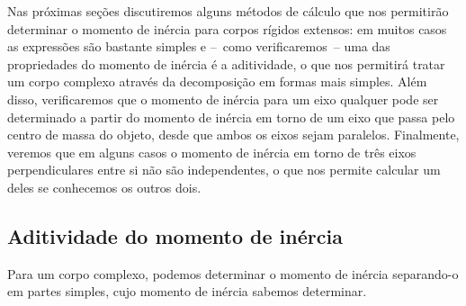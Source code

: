 Nas próximas seções discutiremos alguns métodos de cálculo que nos permitirão determinar o momento de inércia para corpos rígidos extensos: em muitos casos as expressões são bastante simples e --~como verificaremos~-- uma das propriedades do momento de inércia é a aditividade, o que nos permitirá tratar um corpo complexo através da decomposição em formas mais simples. Além disso, verificaremos que o momento de inércia para um eixo qualquer pode ser determinado a partir do momento de inércia em torno de um eixo que passa pelo centro de massa do objeto, desde que ambos os eixos sejam paralelos. Finalmente, veremos que em alguns casos o momento de inércia em torno de três eixos perpendiculares entre si não são independentes, o que nos permite calcular um deles se conhecemos os outros dois.

\subsection{Aditividade do momento de inércia}

\begin{marginfigure}[5cm]
\centering
{}
\caption{Para um corpo complexo, podemos determinar o momento de inércia separando-o em partes simples, cujo momento de inércia sabemos determinar. \label{Fig:AditividadeMomInercia}}
\end{marginfigure}

